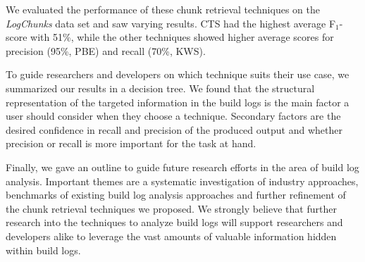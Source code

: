 We evaluated the performance of these chunk retrieval techniques on the
\emph{LogChunks} data set and saw varying results.
CTS had the highest average F$_{1}$-score with 51\%, while the other
techniques showed higher average scores for precision (95\%, PBE)
and recall (70\%, KWS).

To guide researchers and developers on which technique suits their
use case,
we summarized our results in a decision tree.
We found
that the structural representation of the targeted information in the
build logs is the main factor a user should consider when they
choose a
technique.
Secondary factors are the desired confidence in recall and
precision of the produced output and whether precision or recall is
more important for the task at hand.

Finally, we gave an
outline to guide future research efforts in the area of build log
analysis.
Important themes are a systematic investigation of industry approaches,
benchmarks of existing build log analysis approaches and further
refinement of the chunk retrieval techniques we proposed.
We strongly believe that further research into the techniques to
analyze build logs will support researchers and developers alike to
leverage the vast amounts of valuable information
hidden within build logs.
